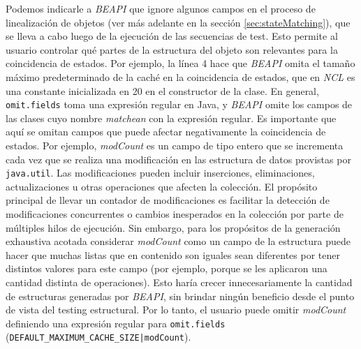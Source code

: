 

Podemos indicarle a \emph{BEAPI} que ignore algunos campos en el proceso de
linealización de objetos (ver más adelante en la sección
\ref{sec:stateMatching}), que se lleva a cabo luego de la ejecución de las
secuencias de test. Esto permite al usuario controlar qué partes de la
estructura del objeto son relevantes para la coincidencia de estados. Por
ejemplo, la línea 4 hace que \emph{BEAPI} omita el tamaño máximo predeterminado
de la caché en la coincidencia de estados, que en \emph{NCL} es una
constante inicializada en 20 en el constructor de la clase. En general, \texttt{omit.fields}
toma una expresión regular en Java, y \emph{BEAPI} omite los campos de las clases
cuyo nombre \emph{matchean} con la expresión regular. Es importante que
aquí se omitan campos que puede afectar negativamente la coincidencia de
estados.
Por ejemplo, \emph{modCount} es un campo de tipo entero que se incrementa 
cada vez que se realiza una modificación en las estructura de datos
provistas por \texttt{java.util}. Las modificaciones pueden incluir 
inserciones, eliminaciones, actualizaciones u otras operaciones que afecten la colección. 
El propósito principal de llevar un contador de modificaciones es facilitar la detección de modificaciones concurrentes o cambios inesperados en la colección por parte de múltiples hilos de ejecución. 
Sin embargo, para los propósitos de la generación exhaustiva acotada considerar \emph{modCount} como un
campo de la estructura puede hacer que muchas listas que en contenido son iguales sean diferentes
por tener distintos valores para este campo (por ejemplo, porque se les
aplicaron una cantidad distinta de operaciones). Esto haría crecer
innecesariamente la cantidad de estructuras generadas por \emph{BEAPI}, sin
brindar ningún beneficio desde el punto de vista del testing estructural.
Por lo tanto, el usuario puede omitir \emph{modCount} definiendo una expresión 
regular para \texttt{omit.fields}
(\texttt{DEFAULT\_MAXIMUM\_CACHE\_SIZE|modCount}).



